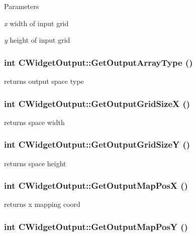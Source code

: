\begin{DoxyParams}{Parameters}
\item[{\em x}]width of input grid \item[{\em y}]height of input grid \end{DoxyParams}
\hypertarget{classCWidgetOutput_abbebacde13cb2cf11c6cf5a14f7756cf}{
\subsubsection[{GetOutputArrayType}]{\setlength{\rightskip}{0pt plus 5cm}int CWidgetOutput::GetOutputArrayType ()}}
\label{classCWidgetOutput_abbebacde13cb2cf11c6cf5a14f7756cf}
returns output space type \hypertarget{classCWidgetOutput_acf934dd6b1c0152fd843a146f1ae1db0}{
\subsubsection[{GetOutputGridSizeX}]{\setlength{\rightskip}{0pt plus 5cm}int CWidgetOutput::GetOutputGridSizeX ()}}
\label{classCWidgetOutput_acf934dd6b1c0152fd843a146f1ae1db0}
returns space width \hypertarget{classCWidgetOutput_ae432e6da755550423efda0da5d35b59f}{
\subsubsection[{GetOutputGridSizeY}]{\setlength{\rightskip}{0pt plus 5cm}int CWidgetOutput::GetOutputGridSizeY ()}}
\label{classCWidgetOutput_ae432e6da755550423efda0da5d35b59f}
returns space height \hypertarget{classCWidgetOutput_ad8ad2678d28bb1193af426e900047094}{
\subsubsection[{GetOutputMapPosX}]{\setlength{\rightskip}{0pt plus 5cm}int CWidgetOutput::GetOutputMapPosX ()}}
\label{classCWidgetOutput_ad8ad2678d28bb1193af426e900047094}
returns x mapping coord \hypertarget{classCWidgetOutput_a255be0716b77039669bef07bb78c95b8}{
\subsubsection[{GetOutputMapPosY}]{\setlength{\rightskip}{0pt plus 5cm}int CWidgetOutput::GetOutputMapPosY ()}}
